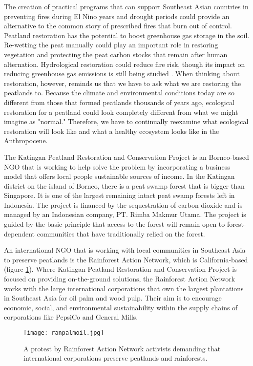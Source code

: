 The creation of practical programs that can support Southeast Asian countries in preventing fires during El Nino years and drought periods could provide an alternative to the common story of prescribed fires that burn out of control. Peatland restoration has the potential to boost greenhouse gas storage in the soil. Re-wetting the peat manually could play an important role in restoring vegetation and protecting the peat carbon stocks that remain after human alternation. Hydrological restoration could reduce fire risk, though its impact on reducing greenhouse gas emissions is still being studied \citep{page2009restoration}. When thinking about restoration, however, \citet{holden2005peatland} reminds us that we have to ask what we are restoring the peatlands to. Because the climate and environmental conditions today are so different from those that formed peatlands thousands of years ago, ecological restoration for a peatland could look completely different from what we might imagine as "normal." Therefore, we have to continually reexamine what ecological restoration will look like and what a healthy ecosystem looks like in the Anthropocene.

The Katingan Peatland Restoration and Conservation Project is an Borneo-based NGO that is working to help solve the problem by incorporating a business model that offers local people sustainable sources of income. In the Katingan district on the island of Borneo, there is a peat swamp forest that is bigger than Singapore. It is one of the largest remaining intact peat swamp forests left in Indonesia. The project is financed by the sequestration of carbon dioxide and is managed by an Indonesian company, PT. Rimba Makmur Utama. The project is guided by the basic principle that access to the forest will remain open to forest-dependent communities that have traditionally relied on the forest.

An international NGO that is working with local communities in Southeast Asia to preserve peatlands is the Rainforest Action Network, which is California-based (figure \ref{fig:ranpalmoil}). Where Katingan Peatland Restoration and Conservation Project is focused on providing on-the-ground solutions, the Rainforest Action Network works with the large international corporations that own the largest plantations in Southeast Asia for oil palm and wood pulp. Their aim is to encourage economic, social, and environmental sustainability within the supply chains of corporations like PepsiCo and General Mills.

\begin{figure}
  \texttt{[image: ranpalmoil.jpg]}
  \caption{A protest by Rainforest Action Network activists demanding that international corporations preserve peatlands and rainforests.}
  \label{fig:ranpalmoil}
\end{figure}

